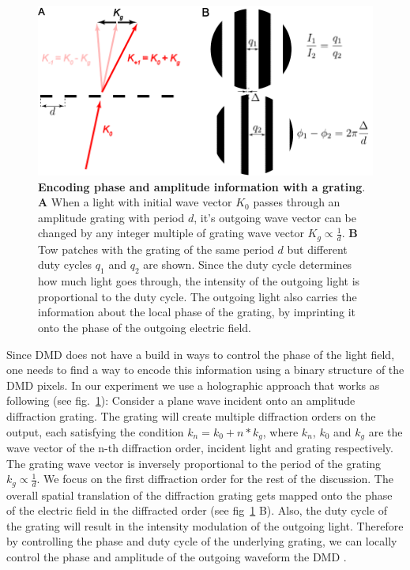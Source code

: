 \begin{figure}[t]
	\centering
	\includegraphics[scale=1]{figures/DMD_grating.pdf}
	\caption{{\bf Encoding phase and amplitude information with a grating}. {\bf A} When a light with initial wave vector $K_0$ passes through an amplitude grating with period $d$, it's outgoing wave vector can be changed by any integer multiple of grating wave vector $K_g\propto \frac{1}{d}$. {\bf B} Tow patches with the grating of the same period $d$ but different duty cycles $q_1$ and $q_2$ are shown. Since the duty cycle determines how much light goes through, the intensity of the outgoing light is proportional to the duty cycle. The outgoing light also carries the information about the local phase of the grating, by imprinting it onto the phase of the outgoing electric field.}
	\label{fig:DMD_grating}
\end{figure}

Since DMD does not have a build in ways to control the phase of the light field, one needs to find a way to encode this information using a binary structure of the DMD pixels. In our experiment we use a holographic approach that works as following (see fig.~\ref{fig:DMD_grating}): Consider a plane wave incident onto an amplitude diffraction grating. The grating will create multiple diffraction orders on the output, each satisfying the condition $k_n = k_0 + n*k_g$, where $k_n$, $k_0$ and $k_g$ are the wave vector of the n-th diffraction order, incident light and grating respectively. The grating wave vector is inversely proportional to the period of the grating $k_g \propto \frac{1}{d}$. We focus on the first diffraction order for the rest of the discussion. The overall spatial translation of the diffraction grating gets mapped onto the phase of the electric field in the diffracted order (see fig~\ref{fig:DMD_grating} B). Also, the duty cycle of the grating will result in the intensity modulation of the outgoing light. Therefore by controlling the phase and duty cycle of the underlying grating, we can locally control the phase and amplitude of the outgoing waveform the DMD \cite{Zupanchich thesis}.

